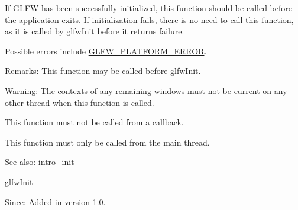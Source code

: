 If GLFW has been successfully initialized, this function should be called before the application exits. If initialization fails, there is no need to call this function, as it is called by \hyperlink{group__init_gb41771f0215a2e0afb4cf1cf98082d40}{glfwInit} before it returns failure.

Possible errors include \hyperlink{group__errors_gd44162d78100ea5e87cdd38426b8c7a1}{GLFW\_\-PLATFORM\_\-ERROR}.

\begin{Desc}
\item[Remarks:]This function may be called before \hyperlink{group__init_gb41771f0215a2e0afb4cf1cf98082d40}{glfwInit}.\end{Desc}
\begin{Desc}
\item[Warning:]The contexts of any remaining windows must not be current on any other thread when this function is called.\end{Desc}
This function must not be called from a callback.

This function must only be called from the main thread.

\begin{Desc}
\item[See also:]intro\_\-init 

\hyperlink{group__init_gb41771f0215a2e0afb4cf1cf98082d40}{glfwInit}\end{Desc}
\begin{Desc}
\item[Since:]Added in version 1.0. \end{Desc}

